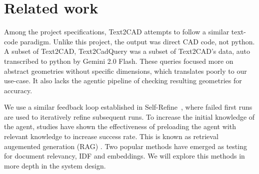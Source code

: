 \section{Related work}
\label{sec:related}



Among the project specifications, Text2CAD \cite{khan2024text2cad} attempts to follow a similar text-code paradigm.
Unlike this project, the output was direct CAD code, not python.
A subset of Text2CAD, Text2CadQuery \cite{xie2025text2cadquery} was a subset of Text2CAD's data, auto transcribed to python by Gemini 2.0 Flash.
These queries focused more on abstract geometries without specific dimensions, which translates poorly to our use-case.
It also lacks the agentic pipeline of checking resulting geometries for accuracy.


We use a similar feedback loop established in Self-Refine~\cite{madaan2023selfrefine}, where failed first runs are used to iteratively refine subsequent runs.
To increase the initial knowledge of the agent, studies have shown the effectiveness of preloading the agent with relevant knowledge to increase success rate.
This is known as retrieval augemented generation (RAG) \cite{lewis2020rag}.
Two popular methods have emerged as testing for document relevancy, IDF and embeddings.
We will explore this methods in more depth in the system design.



